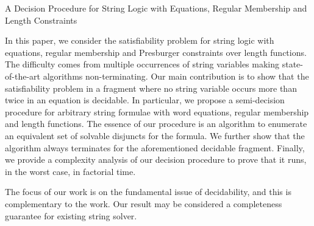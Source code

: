 A Decision Procedure for String Logic with Equations, Regular Membership and Length Constraints \cite{L16}

In this paper, we consider the satisfiability problem for string logic with equations, regular membership and Presburger constraints over length functions. The difficulty comes from multiple occurrences of string variables making state-of-the-art algorithms non-terminating. Our main contribution is to show that the satisfiability problem in a fragment where no string variable occurs more than twice in an equation is decidable. In particular, we propose a semi-decision procedure for arbitrary string formulae with word equations, regular membership and length functions. The essence of our procedure is an algorithm to enumerate an equivalent set of solvable disjuncts for the formula. We further show that the algorithm always terminates for the aforementioned decidable fragment. Finally, we provide a complexity analysis of our decision procedure to prove that it runs, in the worst case, in factorial time.

The focus of our work is on the fundamental issue of decidability, and this is complementary to the work. Our result may be considered a completeness guarantee for existing string solver. 